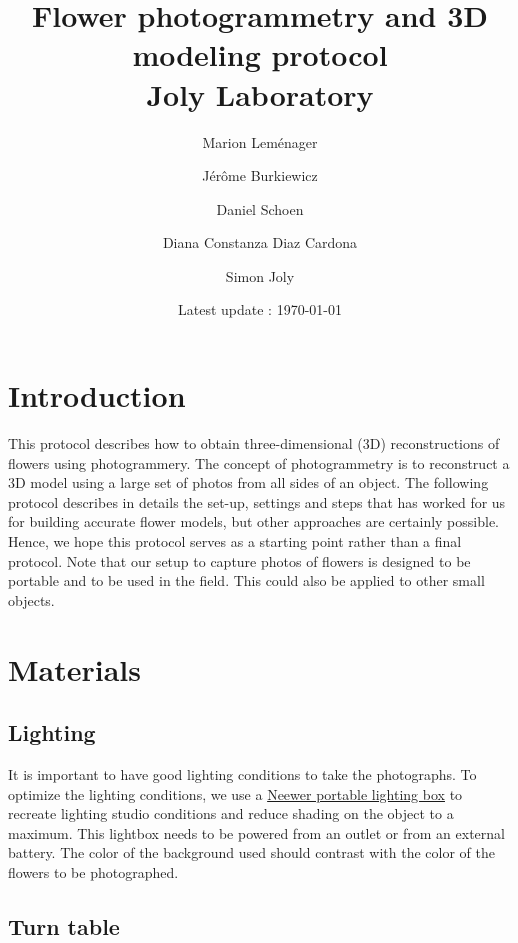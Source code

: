 \documentclass[10pt,letter,english]{article}
\title{Flower photogrammetry and 3D modeling protocol\\Joly Laboratory}
\date{Latest update : \today}
\author[1]{Marion Leménager}
\author[1]{Jérôme Burkiewicz}
\author[2]{Daniel Schoen}
\author[3]{Diana Constanza Diaz Cardona}
\author[1,3]{Simon Joly}
\affil[1]{Institut de recherche en biologie végétale, Département de Sciences Biologiques, Université de Montréal}
\affil[2]{Biology department, McGill University}
\affil[3]{Jardin Botanique de Montréal}
\begin{document}
\maketitle
\tableofcontents



\section{Introduction}

This protocol describes how to obtain three-dimensional (3D) reconstructions of flowers using photogrammery. The concept of photogrammetry is to reconstruct a 3D model using a large set of photos from all sides of an object. The following protocol describes in details the set-up, settings and steps that has worked for us for building accurate flower models, but other approaches are certainly possible. Hence, we hope this protocol serves as a starting point rather than a final protocol. Note that our setup to capture photos of flowers is designed to be portable and to be used in the field. This could also be applied to other small objects.

\section{Materials}

\subsection{Lighting}

It is important to have good lighting conditions to take the photographs.
To optimize the lighting conditions, we use a \href{https://neewer.com/collections/shooting-tent}{Neewer portable lighting box} to recreate lighting studio conditions and reduce shading on the object to a maximum. This lightbox needs to be powered from an outlet or from an external battery.
The color of the background used should contrast with the color of the flowers to be photographed.




\subsection{Turn table}
\end{document}
